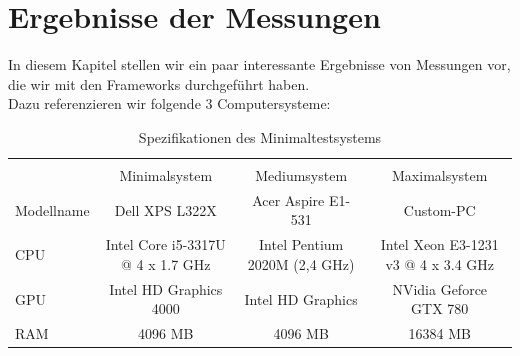 \chapter{Ergebnisse der Messungen}
\label{ch:results}
In diesem Kapitel stellen wir ein paar interessante Ergebnisse von Messungen vor, die wir mit den Frameworks durchgeführt haben.\\
Dazu referenzieren wir folgende 3 Computersysteme:

\begin{table}
    \begin{tabular}{ | l | c | c | c |}
    \hline \\
    			& Minimalsystem						& Mediumsystem					& Maximalsystem							\\ \hline
    Modellname 	& Dell XPS L322X 					& Acer Aspire E1-531			& Custom-PC 							\\ \hline
    CPU 		& Intel Core i5-3317U @ 4 x 1.7 GHz & Intel Pentium 2020M (2,4 GHz) & Intel Xeon E3-1231 v3 @ 4 x 3.4 GHz 	\\ \hline
    GPU 		& Intel HD Graphics 4000 			& Intel HD Graphics				& NVidia Geforce GTX 780				\\ \hline
    RAM 		& 4096 MB 							& 4096 MB						& 16384 MB 								\\ \hline
    \end{tabular}
    \caption{Spezifikationen des Minimaltestsystems}
   	\label{tab:allspecs}
\end{table}

